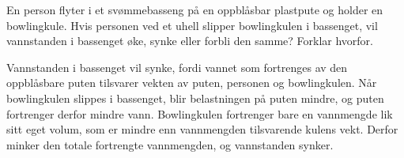 

En person flyter i et svømmebasseng på en oppblåsbar plastpute og holder en bowlingkule. Hvis personen ved et uhell slipper bowlingkulen i bassenget, vil vannstanden i bassenget øke, synke eller forbli den samme? Forklar hvorfor.







Vannstanden i bassenget vil synke, fordi vannet som fortrenges av den oppblåsbare puten tilsvarer vekten av puten, personen og bowlingkulen. Når bowlingkulen slippes i bassenget, blir belastningen på puten mindre, og puten fortrenger derfor mindre vann. Bowlingkulen fortrenger bare en vannmengde lik sitt eget volum, som er mindre enn vannmengden tilsvarende kulens vekt. Derfor minker den totale fortrengte vannmengden, og vannstanden synker.









